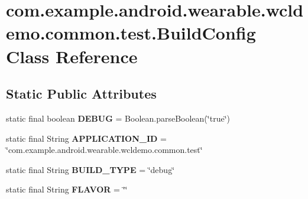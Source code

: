 \hypertarget{classcom_1_1example_1_1android_1_1wearable_1_1wcldemo_1_1common_1_1test_1_1BuildConfig}{}\section{com.\+example.\+android.\+wearable.\+wcldemo.\+common.\+test.\+Build\+Config Class Reference}
\label{classcom_1_1example_1_1android_1_1wearable_1_1wcldemo_1_1common_1_1test_1_1BuildConfig}
\subsection*{Static Public Attributes}
\begin{DoxyCompactItemize}
\item 
static final boolean {\bfseries D\+E\+B\+UG} = Boolean.\+parse\+Boolean(\char`\"{}true\char`\"{})\hypertarget{classcom_1_1example_1_1android_1_1wearable_1_1wcldemo_1_1common_1_1test_1_1BuildConfig_a1b97025bd9a40b64b1dba0cf762b8379}{}\label{classcom_1_1example_1_1android_1_1wearable_1_1wcldemo_1_1common_1_1test_1_1BuildConfig_a1b97025bd9a40b64b1dba0cf762b8379}

\item 
static final String {\bfseries A\+P\+P\+L\+I\+C\+A\+T\+I\+O\+N\+\_\+\+ID} = \char`\"{}com.\+example.\+android.\+wearable.\+wcldemo.\+common.\+test\char`\"{}\hypertarget{classcom_1_1example_1_1android_1_1wearable_1_1wcldemo_1_1common_1_1test_1_1BuildConfig_a4f6422c9116c70c8cf45566d28b8aa94}{}\label{classcom_1_1example_1_1android_1_1wearable_1_1wcldemo_1_1common_1_1test_1_1BuildConfig_a4f6422c9116c70c8cf45566d28b8aa94}

\item 
static final String {\bfseries B\+U\+I\+L\+D\+\_\+\+T\+Y\+PE} = \char`\"{}debug\char`\"{}\hypertarget{classcom_1_1example_1_1android_1_1wearable_1_1wcldemo_1_1common_1_1test_1_1BuildConfig_a94f32154f49b8ad1e11f0fcb13cb39d7}{}\label{classcom_1_1example_1_1android_1_1wearable_1_1wcldemo_1_1common_1_1test_1_1BuildConfig_a94f32154f49b8ad1e11f0fcb13cb39d7}

\item 
static final String {\bfseries F\+L\+A\+V\+OR} = \char`\"{}\char`\"{}\hypertarget{classcom_1_1example_1_1android_1_1wearable_1_1wcldemo_1_1common_1_1test_1_1BuildConfig_ad711824d0baab097553ea44817af8b77}{}\label{classcom_1_1example_1_1android_1_1wearable_1_1wcldemo_1_1common_1_1test_1_1BuildConfig_ad711824d0baab097553ea44817af8b77}


\end{DoxyCompactItemize}
